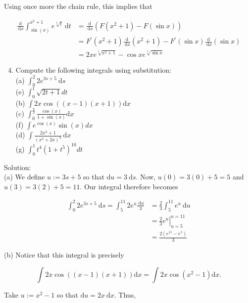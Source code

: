 \documentclass[10pt]{article}
\begin{document}
Using once more the chain rule, this implies that

$$
\begin{aligned}
\frac{\mathrm{d}}{\mathrm{~d} x} \int_{\sin (x)}^{x^{2}+1} e^{\sqrt[3]{t}} \mathrm{~d} t & =\frac{\mathrm{d}}{\mathrm{~d} x}\left(F\left(x^{2}+1\right)-F(\sin x)\right) \\
& =F^{\prime}\left(x^{2}+1\right) \frac{\mathrm{d}}{\mathrm{~d} x}\left(x^{2}+1\right)-F^{\prime}(\sin x) \frac{\mathrm{d}}{\mathrm{~d} x}(\sin x) \\
& =2 x e^{\sqrt[3]{x^{2}+1}}-\cos x e^{\sqrt[3]{\sin x}}
\end{aligned}
$$

\begin{enumerate}
  \setcounter{enumi}{3}
  \item Compute the following integrals using substitution:\\
(a) $\int_{0}^{2} 2 e^{3 s+5} \mathrm{~d} s$\\
(e) $\int_{0}^{1} \sqrt{2 t+1} d t$\\
(b) $\int 2 x \cos ((x-1)(x+1)) \mathrm{d} x$\\
(c) $\int_{0}^{\frac{\pi}{2}} \frac{\cos (x)}{1+\sin (x)} \mathrm{d} x$\\
(f) $\int e^{\cos (x)} \sin (x) d x$\\
(d) $\int \frac{2 x^{3}+1}{\left(x^{4}+2 x\right)^{3}} \mathrm{~d} x$\\
(g) $\int_{0}^{1} t^{4}\left(1+t^{5}\right)^{10} d t$
\end{enumerate}

Solution:\\
(a) We define $u:=3 s+5$ so that $\mathrm{d} u=3 \mathrm{~d} s$. Now, $u(0)=3(0)+5=5$ and $u(3)=3(2)+5=11$. Our integral therefore becomes

$$
\begin{aligned}
\int_{0}^{2} 2 e^{3 s+5} \mathrm{~d} s=\int_{5}^{11} 2 e^{u} \frac{\mathrm{~d} u}{3} & =\frac{2}{3} \int_{5}^{11} e^{u} \mathrm{~d} u \\
& =\left.\frac{2}{3} e^{u}\right|_{u=5} ^{u=11} \\
& =\frac{2\left(e^{11}-e^{5}\right)}{3}
\end{aligned}
$$

(b) Notice that this integral is precisely

$$
\int 2 x \cos ((x-1)(x+1)) \mathrm{d} x=\int 2 x \cos \left(x^{2}-1\right) \mathrm{d} x .
$$

Take $u:=x^{2}-1$ so that $\mathrm{d} u=2 x \mathrm{~d} x$. Thus,
\end{document}

